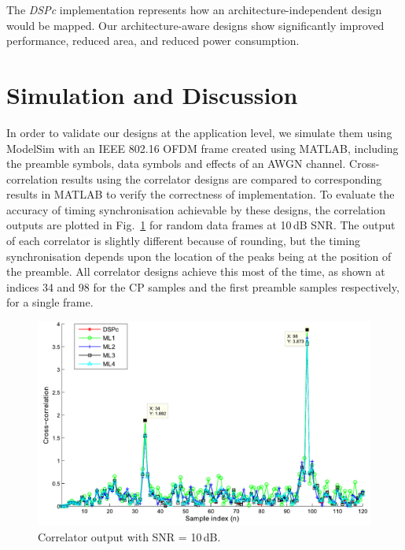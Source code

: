 The \emph{DSPc} implementation represents how an architecture-independent design would be mapped. Our architecture-aware designs show significantly improved performance, reduced area, and reduced power consumption.

\section{Simulation and Discussion}
In order to validate our designs at the application level, we simulate them using ModelSim with an IEEE 802.16 OFDM frame created using MATLAB, including the preamble symbols, data symbols and effects of an AWGN channel.
Cross-correlation results using the correlator designs are compared to corresponding results in MATLAB to verify the correctness of implementation.
To evaluate the accuracy of timing synchronisation achievable by these designs, the correlation outputs are plotted in Fig.~\ref{fig:Plot_XCR} for random data frames at 10\,dB SNR.
The output of each correlator is slightly different because of rounding, but the timing synchronisation depends upon the location of the peaks being at the  position of the preamble.
All correlator designs achieve this most of the time, as shown at indices 34 and 98 for the CP samples and the first preamble samples respectively, for a single frame.

\begin{figure}
	\centerline{\includegraphics [width=0.9\columnwidth] {figures/Plot_XCR.pdf} }
	\caption{Correlator output with SNR = 10\,dB.}
	\label{fig:Plot_XCR}
\end{figure}

